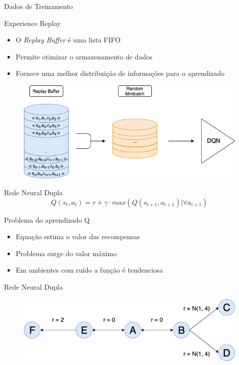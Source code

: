 \documentclass[aspectratio=169]{beamer}
\begin{document}
\begin{frame}{Dados de Treinamento}
	\begin{block}{Experience Replay}
		\begin{itemize}
			\item O \textit{Replay Buffer} é uma lista FIFO
			\item Permite otimizar o armazenamento de dados
			\item Fornece uma melhor distribuição de informações para o aprendizado
		\end{itemize}
	\end{block}
	\begin{figure}
		\centering
		\includegraphics[width=.6 \textwidth]{imgs/experience_replay.png}
	\end{figure}
\end{frame}

\begin{frame}{Rede Neural Dupla}
$$Q(s_t, a_t)= r + \gamma \cdot max(Q(s_{t+1},a_{t+1})|\forall a_{t+1})$$

\begin{block}{Problema do aprendizado Q}
	\begin{itemize}
		\item Equação estima o valor das recompensas
		\item Problema surge do valor máximo
		\item Em ambientes com ruído a função é tendenciosa
	\end{itemize}
\end{block}

\end{frame}

\begin{frame}{Rede Neural Dupla}
	\begin{figure}
		\centering
		\includegraphics[width=1 \textwidth]{imgs/dqn_bias.png}
	\end{figure}
\end{frame}
\end{document}
